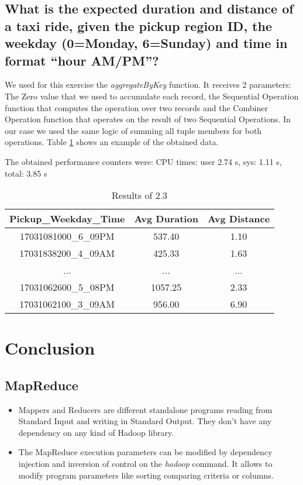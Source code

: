 \documentclass[conference,compsoc]{IEEEtran}
\begin{document}
\subsection{What is the expected duration and distance of a taxi ride, given the pickup region ID, the weekday (0=Monday, 6=Sunday) and time in format “hour AM/PM”?}

We used for this exercise the \textit{aggregateByKey} function. It receives 2 parameters: The Zero value that we used to accumulate each record, the Sequential Operation function that computes the operation over two records and the Combiner Operation function that operates on the result of two Sequential Operations. In our case we used the same logic of summing all tuple members for both operations. Table \ref{output_2_3} shows an example of the obtained data. \par
The obtained performance counters were: CPU times: user 2.74 s, sys: 1.11 s, total: 3.85 s

\begin{table}[!t]
\renewcommand{\arraystretch}{1.3}
\caption{Results of 2.3}
\label{output_2_3}
\centering
\begin{tabular}{c||c|c}
\hline
\bfseries Pickup\_Weekday\_Time & \bfseries Avg Duration & \bfseries Avg Distance\\
\hline\hline
17031081000\_6\_09PM & 537.40 & 1.10\\
17031838200\_4\_09AM & 425.33 & 1.63\\
... & ... & ...\\
17031062600\_5\_08PM & 1057.25 & 2.33\\
17031062100\_3\_09AM & 956.00 & 6.90\\
\hline
\end{tabular}
\end{table}
\section{Conclusion}

\subsection{MapReduce}
\begin{itemize}
\item Mappers and Reducers are different standalone programs reading from Standard Input and writing in Standard Output. They don't have any dependency on any kind of Hadoop library.
\item The MapReduce execution parameters can be modified by dependency injection and inversion of control on the \textit{hadoop} command. It allows to modify program parameters like sorting comparing criteria or columns.
\end{itemize}
\end{document}

